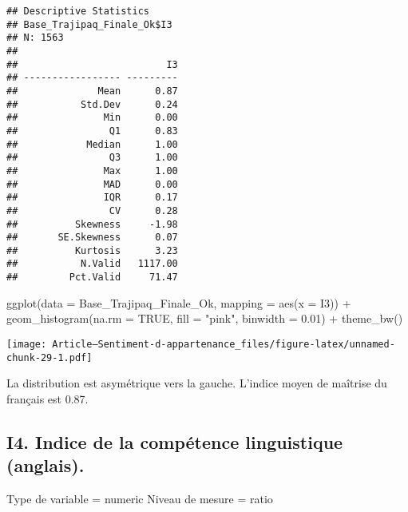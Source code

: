 \documentclass[
]{article}
\newenvironment{Shaded}{\begin{snugshade}}{\end{snugshade}}
\newcommand{\AttributeTok}[1]{\textcolor[rgb]{0.77,0.63,0.00}{#1}}
\newcommand{\ConstantTok}[1]{\textcolor[rgb]{0.00,0.00,0.00}{#1}}
\newcommand{\FloatTok}[1]{\textcolor[rgb]{0.00,0.00,0.81}{#1}}
\newcommand{\FunctionTok}[1]{\textcolor[rgb]{0.00,0.00,0.00}{#1}}
\newcommand{\NormalTok}[1]{#1}
\newcommand{\SpecialCharTok}[1]{\textcolor[rgb]{0.00,0.00,0.00}{#1}}
\newcommand{\StringTok}[1]{\textcolor[rgb]{0.31,0.60,0.02}{#1}}
\begin{document}
\begin{verbatim}
## Descriptive Statistics  
## Base_Trajipaq_Finale_Ok$I3  
## N: 1563  
## 
##                          I3
## ----------------- ---------
##              Mean      0.87
##           Std.Dev      0.24
##               Min      0.00
##                Q1      0.83
##            Median      1.00
##                Q3      1.00
##               Max      1.00
##               MAD      0.00
##               IQR      0.17
##                CV      0.28
##          Skewness     -1.98
##       SE.Skewness      0.07
##          Kurtosis      3.23
##           N.Valid   1117.00
##         Pct.Valid     71.47
\end{verbatim}

\begin{Shaded}
\begin{Highlighting}[]
\FunctionTok{ggplot}\NormalTok{(}\AttributeTok{data =}\NormalTok{ Base\_Trajipaq\_Finale\_Ok, }\AttributeTok{mapping =} \FunctionTok{aes}\NormalTok{(}\AttributeTok{x =}\NormalTok{ I3)) }\SpecialCharTok{+}
  \FunctionTok{geom\_histogram}\NormalTok{(}\AttributeTok{na.rm =} \ConstantTok{TRUE}\NormalTok{, }\AttributeTok{fill =} \StringTok{"pink"}\NormalTok{, }\AttributeTok{binwidth =} \FloatTok{0.01}\NormalTok{) }\SpecialCharTok{+}
  \FunctionTok{theme\_bw}\NormalTok{()}
\end{Highlighting}
\end{Shaded}

\texttt{[image: Article---Sentiment-d-appartenance\_files/figure-latex/unnamed-chunk-29-1.pdf]}

La distribution est asymétrique vers la gauche. L'indice moyen de
maîtrise du français est 0.87.

\hypertarget{i4.-indice-de-la-compuxe9tence-linguistique-anglais.}{%
\subsection{I4. Indice de la compétence linguistique
(anglais).}\label{i4.-indice-de-la-compuxe9tence-linguistique-anglais.}}

Type de variable = numeric Niveau de mesure = ratio
\end{document}
